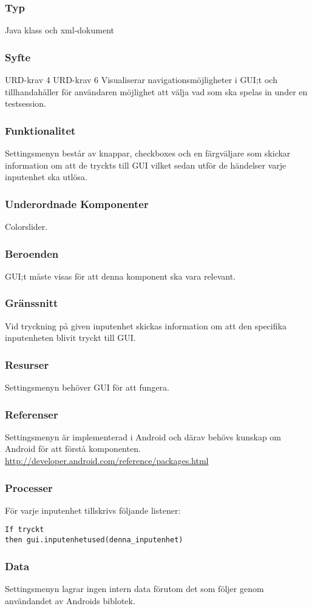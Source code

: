 \subsubsection{Typ}
Java klass och xml-dokument

\subsubsection{Syfte}
URD-krav 4
URD-krav 6
Visualiserar navigationsmöjligheter i GUI;t och tillhandahåller för användaren möjlighet att välja vad som ska spelas in under en testsession. 

\subsubsection{Funktionalitet}
Settingsmenyn består av knappar, checkboxes och en färgväljare som skickar information om att de tryckts till GUI vilket sedan utför de händelser varje inputenhet ska utlösa.

\subsubsection{Underordnade Komponenter}
Colorslider.

\subsubsection{Beroenden}
GUI;t måste visas för att denna komponent ska vara relevant.

\subsubsection{Gränssnitt}
Vid tryckning på given inputenhet skickas information om att den specifika inputenheten blivit tryckt till GUI.

\subsubsection{Resurser}
Settingsmenyn behöver GUI för att fungera.

\subsubsection{Referenser}
Settingsmenyn är implementerad i Android och därav behövs kunskap om Android för att förstå komponenten.
\url{http://developer.android.com/reference/packages.html}

\subsubsection{Processer}
För varje inputenhet tillskrivs följande listener:
\begin{verbatim}
If tryckt
then gui.inputenhetused(denna_inputenhet)
\end{verbatim}

\subsubsection{Data}
Settingsmenyn lagrar ingen intern data förutom det som följer genom användandet av Androids biblotek.